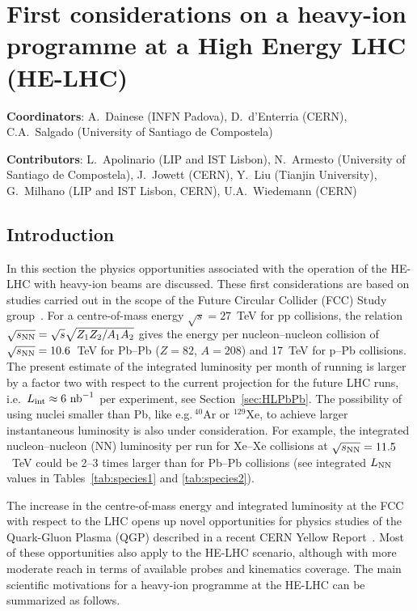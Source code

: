 \documentclass[../report.tex]{subfiles}
\begin{document}
\section{First considerations on a heavy-ion programme at a High Energy LHC (HE-LHC)}
\label{sec:HELHC}

{ \small
\noindent \textbf{Coordinators}: A.~Dainese (INFN Padova), D.~d'Enterria (CERN), C.A.~Salgado (University of Santiago de Compostela)

\noindent \textbf{Contributors}: L.~Apolinario (LIP and IST Lisbon), N.~Armesto (University of Santiago de Compostela), J.~Jowett (CERN), Y.~Liu (Tianjin University), G.~Milhano (LIP and IST Lisbon, CERN), U.A.~Wiedemann (CERN)
}

\subsection{Introduction}
\label{sec:HELHC_intro}

In this section the physics opportunities associated with the operation of the HE-LHC with heavy-ion beams are discussed.
These first considerations are based on studies carried out in the scope of the Future Circular Collider (FCC) Study group~\cite{Dainese:2016gch,FCC-CDR}.
For a centre-of-mass energy $\sqrt{s}= 27$~TeV for pp collisions, the relation $\sqrt{s_{\rm NN}}= \sqrt {s} \sqrt{Z_1 Z_2 / A_1 A_2}$ 
gives the energy per nucleon--nucleon collision of $\sqrt{s_{\rm NN}} = 10.6$~TeV for Pb--Pb ($Z=82$, $A=208$) and 17~TeV for p--Pb collisions. 
The present estimate of the integrated luminosity per month of running is larger by a factor two with respect to the current projection for the future 
LHC runs, i.e.\, $L_{\rm int}\approx 6~{\rm nb}^{-1}$ per experiment, see Section~\ref{sec:HLPbPb}. 
The possibility of using nuclei smaller than Pb, like e.g.\,$^{40}$Ar or $^{129}$Xe, to achieve larger instantaneous luminosity is also under consideration. 
For example, the integrated nucleon--nucleon (NN) luminosity per run 
for Xe--Xe collisions at $\sqrt{s_{\rm NN}}= 11.5$~TeV could be 2--3 times larger than for Pb--Pb collisions (see integrated $L_{\rm NN}$ values in Tables~\ref{tab:species1} and \ref{tab:species2}).

The increase in the centre-of-mass energy and integrated luminosity at the FCC with respect to the LHC opens up novel opportunities for physics studies of the Quark-Gluon Plasma (QGP) described in a recent CERN Yellow Report~\cite{Dainese:2016gch}. Most of these opportunities also apply to the HE-LHC scenario, although 
with more moderate reach in terms of available probes and kinematics coverage.
The main scientific motivations for a heavy-ion programme at the HE-LHC can be summarized as follows.
\end{document}
